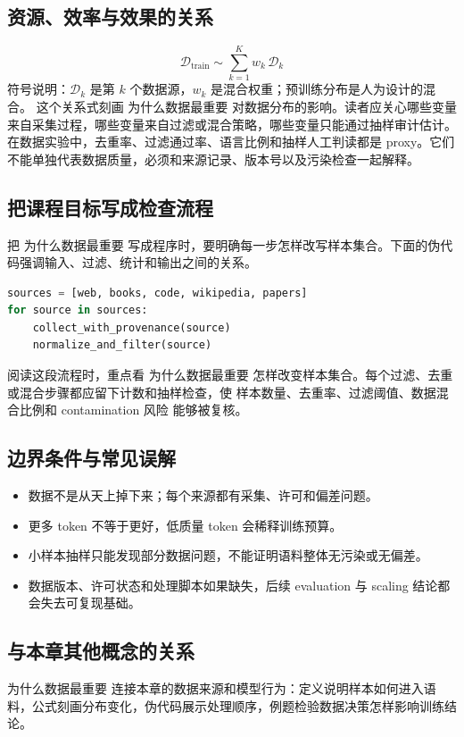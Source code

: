 \documentclass[a4paper]{article}
\begin{document}
\subsection{资源、效率与效果的关系}
\[\mathcal{D}_{\text{train}}\sim \sum_{k=1}^{K} w_k\,\mathcal{D}_k\]
符号说明：\(\mathcal{D}_k\) 是第 \(k\) 个数据源，\(w_k\) 是混合权重；预训练分布是人为设计的混合。
这个关系式刻画 为什么数据最重要 对数据分布的影响。读者应关心哪些变量来自采集过程，哪些变量来自过滤或混合策略，哪些变量只能通过抽样审计估计。
在数据实验中，去重率、过滤通过率、语言比例和抽样人工判读都是 proxy。它们不能单独代表数据质量，必须和来源记录、版本号以及污染检查一起解释。
\subsection{把课程目标写成检查流程}
把 为什么数据最重要 写成程序时，要明确每一步怎样改写样本集合。下面的伪代码强调输入、过滤、统计和输出之间的关系。
\begin{lstlisting}[language=Python]
sources = [web, books, code, wikipedia, papers]
for source in sources:
    collect_with_provenance(source)
    normalize_and_filter(source)
\end{lstlisting}
阅读这段流程时，重点看 为什么数据最重要 怎样改变样本集合。每个过滤、去重或混合步骤都应留下计数和抽样检查，使 样本数量、去重率、过滤阈值、数据混合比例和 contamination 风险 能够被复核。
\subsection{边界条件与常见误解}
\begin{itemize}
\item 数据不是从天上掉下来；每个来源都有采集、许可和偏差问题。
\item 更多 token 不等于更好，低质量 token 会稀释训练预算。
\item 小样本抽样只能发现部分数据问题，不能证明语料整体无污染或无偏差。
\item 数据版本、许可状态和处理脚本如果缺失，后续 evaluation 与 scaling 结论都会失去可复现基础。
\end{itemize}
\subsection{与本章其他概念的关系}
为什么数据最重要 连接本章的数据来源和模型行为：定义说明样本如何进入语料，公式刻画分布变化，伪代码展示处理顺序，例题检验数据决策怎样影响训练结论。
\end{document}
